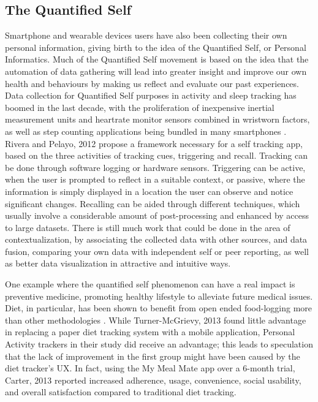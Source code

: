 \subsection{The Quantified Self}
Smartphone and wearable devices users have also been collecting their own personal information, giving birth to the idea of the Quantified Self, or Personal Informatics. \cite{rapp2014}
Much of the Quantified Self movement is based on the idea that the automation of data gathering will lead into greater insight and improve our own health and behaviours by making us reflect and evaluate our past experiences. Data collection for Quantified Self purposes in activity and sleep tracking has boomed in the last decade, with the proliferation of inexpensive inertial measurement units and heartrate monitor sensors combined in wristworn factors, as well as step counting applications being bundled in many smartphones \cite{Crawford2015}.\\
Rivera and Pelayo, 2012 \cite{Rivera-Pelayo2012} propose a framework necessary for a self tracking app, based on the three activities of tracking cues, triggering and recall.
Tracking can be done through software logging or hardware sensors. Triggering can be active, when the user is prompted to reflect in a suitable context, or passive, where the information is simply displayed in a location the user can observe and notice significant changes. Recalling can be aided through different techniques, which usually involve a considerable amount of post-processing and enhanced by access to large datasets. There is still much work that could be done in the area of contextualization, by associating the collected data with other sources, and data fusion, comparing your own data with independent self or peer reporting, as well as better data visualization in attractive and intuitive ways.

One example where the quantified self phenomenon can have a real impact is preventive medicine, promoting healthy lifestyle to alleviate future medical issues. Diet, in particular, has been shown to benefit from open ended food-logging more than other methodologies \cite{Bingham1994}. While Turner-McGrievy, 2013 \cite{Turner-McGrievy2013} found little advantage in replacing a paper diet tracking system with a mobile application, Personal Activity trackers in their study did receive an advantage; this leads to speculation that the lack of improvement in the first group might have been caused by the diet tracker's UX. In fact, using the My Meal Mate app over a 6-month trial, Carter, 2013 \cite{carter2013adherence} reported increased adherence, usage, convenience, social usability, and overall satisfaction compared to traditional diet tracking. 

